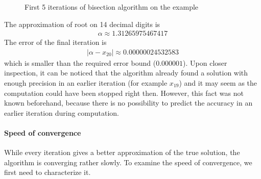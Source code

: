 \documentclass[
  digital, %
  notable,   %
  nolof,     %
  nolot,     %
	final, %
]{fithesis3}
\begin{document}
\begin{figure}
\centering
\def\FunctionF(#1){2*(#1)^4-3*(#1)-2}%
\caption{First 5 iterations of bisection algorithm on the example} \label{fig:bisp}
\end{figure}

The approximation of root on 14 decimal digits is
\begin{align}
      \alpha \approx 1.31265975467417
\end{align}
The error of the final iteration is
\begin{align}
      |\alpha - x_{20}| \approx 0.00000024532583
\end{align}
which is smaller than the required error bound ($0.000001$). Upon closer inspection, it can be noticed that the algorithm already found a solution with enough precision in an earlier iteration (for example $x_{19}$) and it may seem as the computation could have been stopped right then. However, this fact was not known beforehand, because there is no possibility to predict the accuracy in an earlier iteration during computation.

\paragraph{Speed of convergence}
While every iteration gives a better approximation of the true solution, the algorithm is converging rather slowly. To examine the speed of convergence, we first need to characterize it.
\end{document}
